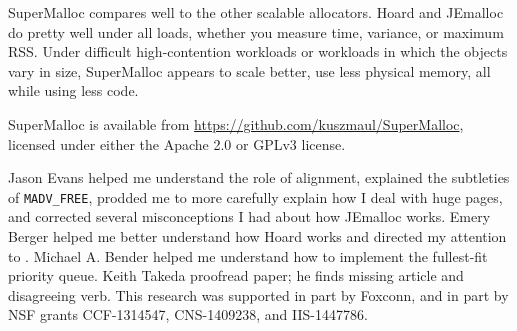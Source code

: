 \documentclass[natbib,sort&compress,10pt]{sigplanconf}
\newcommand{\code}[1]{\texttt{#1}}
\begin{document}



SuperMalloc compares well to the other scalable allocators.  Hoard and
JEmalloc do pretty well under all loads, whether you measure time,
variance, or maximum RSS.  Under difficult high-contention workloads
or workloads in which the objects vary in size, SuperMalloc appears to
scale better, use less physical memory, all while using less code.

SuperMalloc is available from
\url{https://github.com/kuszmaul/SuperMalloc}, licensed under either
the Apache 2.0 or GPLv3 license.

\acks

Jason Evans helped me understand the role of alignment, explained the
subtleties of \code{MADV\_FREE}, prodded me to more carefully explain
how I deal with huge pages, and corrected several misconceptions I had
about how JEmalloc works.  Emery Berger helped me better understand
how Hoard works and directed my attention to \cite{HertzFeBe05,
  YangBeKa06}.  Michael A. Bender helped me understand how to
implement the fullest-fit priority queue.  Keith Takeda proofread
paper; he finds missing article and disagreeing verb.  This research
was supported in part by Foxconn, and in part by NSF grants
CCF-1314547, CNS-1409238, and IIS-1447786.

{\raggedright


}

\end{document}
